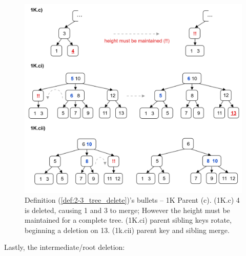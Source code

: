 \vspace{-1.5em}
\begin{figure}[ht!] 
    \begin{center}
    \includegraphics[width=\textwidth]{./Sections/graphs/search/2_3_delete_3.png}
    \end{center}

    \vspace{-1.5em}
     \caption{Definition (\ref{def:2-3_tree_delete})'s bullets -- 1K Parent (c). (1K.c) 4 is deleted, causing 1 and 3 to merge; However the 
     height must be maintained for a complete tree. (1K.ci) parent sibling keys rotate, beginning a deletion on 13. (1k.cii) parent key and sibling merge.}\label{fig:2-3_tree_delete_3}
\end{figure}
\newpage

\newpage 

\noindent
Lastly, the intermediate/root deletion:

